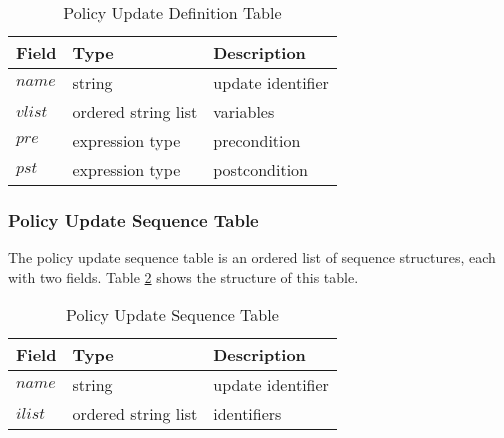 \documentclass[11pt]{report}
\begin{document}
            \begin{table}[tbhp]
              \begin{center}
                \begin{tabular}[t]{|l|l|l|}
                  \hline
                  \textbf{Field} & \textbf{Type}       & \textbf{Description} \\
                  \hline
                  $name$         & string              & update identifier \\
                  \hline
                  $vlist$        & ordered string list & variables \\
                  \hline
                  $pre$          & expression type     & precondition \\
                  \hline
                  $pst$          & expression type     & postcondition \\
                  \hline
                \end{tabular}
              \end{center}
              \caption{Policy Update Definition Table}
              \label{tabl-polup-pdtab}
            \end{table}

        \subsubsection{Policy Update Sequence Table}

          The policy update sequence table is an ordered list of sequence
          structures, each with two fields. Table \ref{tabl-polup-pstab}
          shows the structure of this table.

          \begin{table}[tbhp]
            \begin{center}
              \begin{tabular}[t]{|l|l|l|}
                \hline
                \textbf{Field} & \textbf{Type}       & \textbf{Description} \\
                \hline
                $name$         & string              & update identifier \\
                \hline
                $ilist$        & ordered string list & identifiers \\
                \hline
              \end{tabular}
            \end{center}
            \caption{Policy Update Sequence Table}
            \label{tabl-polup-pstab}
          \end{table}
\end{document}
